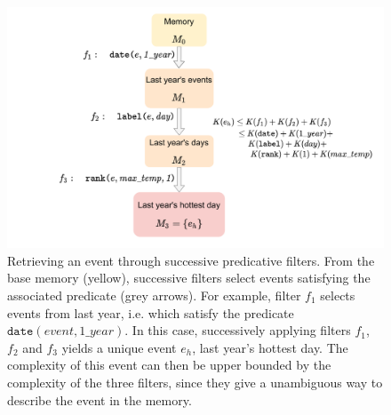 \documentclass[conference]{IEEEtran}
\begin{document}

\begin{figure}[ht]
  \centering
  \includegraphics[width=\linewidth]{figures/filters}
  \caption{Retrieving an event through successive predicative
    filters. From the base memory (yellow), successive filters select events satisfying the associated predicate (grey arrows). For example,
    filter $f_1$ selects events from last year, i.e. which satisfy the
    predicate $\mathtt{date}(event, 1\_year)$. In this case, successively
    applying filters $f_1$, $f_2$ and $f_3$ yields a unique event $e_h$, last
    year's hottest day. The complexity of this event can then be upper bounded
    by the complexity of the three filters, since they give a unambiguous way
    to describe the event in the memory.}
  \label{fig:filters}
\end{figure}
\end{document}
